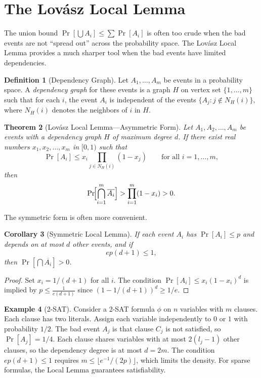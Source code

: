 \documentclass[twoside,12pt]{book}
\theoremstyle{plain}
\newtheorem{theorem}{Theorem}[chapter]
\newtheorem{corollary}[theorem]{Corollary}
\theoremstyle{definition}
\newtheorem{definition}[theorem]{Definition}
\newtheorem{example}[theorem]{Example}
\theoremstyle{remark}
\begin{document}
\section{The Lov\'{a}sz Local Lemma}
\label{sec:lll}

The union bound $\Pr[\bigcup A_i] \leq \sum \Pr[A_i]$ is often too crude
when the bad events are not ``spread out'' across the probability space.
The Lov\'{a}sz Local Lemma provides a much sharper tool when the bad
events have limited dependencies.

\begin{definition}[Dependency Graph]
Let $A_1, \ldots, A_m$ be events in a probability space. A
\emph{dependency graph} for these events is a graph $H$ on vertex set
$\{1, \ldots, m\}$ such that for each $i$, the event $A_i$ is independent
of the events $\{A_j : j \notin N_H(i)\}$, where $N_H(i)$ denotes the
neighbors of $i$ in $H$.
\end{definition}

\begin{theorem}[Lov\'{a}sz Local Lemma---Asymmetric Form]
\label{thm:lll}
Let $A_1, A_2, \ldots, A_m$ be events with a dependency graph $H$ of
maximum degree $d$. If there exist real numbers $x_1, x_2, \ldots, x_m$
in $[0, 1)$ such that
\[
\Pr[A_i] \leq x_i \prod_{j \in N_H(i)} (1 - x_j)
\qquad \text{for all } i = 1, \ldots, m,
\]
then
\[
\Pr\!\Bigl[\bigcap_{i=1}^{m} \overline{A_i}\Bigr]
> \prod_{i=1}^{m} (1 - x_i) > 0.
\]
\end{theorem}

The symmetric form is often more convenient.

\begin{corollary}[Symmetric Local Lemma]
\label{cor:lll-symmetric}
If each event $A_i$ has $\Pr[A_i] \leq p$ and depends on at most $d$
other events, and if
\[
ep(d + 1) \leq 1,
\]
then $\Pr[\bigcap \overline{A_i}] > 0$.
\end{corollary}

\begin{proof}
Set $x_i = 1/(d+1)$ for all $i$. The condition $\Pr[A_i] \leq
x_i(1 - x_i)^d$ is implied by $p \leq \frac{1}{e(d+1)}$ since
$(1 - 1/(d+1))^d \geq 1/e$.
\end{proof}

\begin{example}[2-SAT]
Consider a 2-SAT formula $\phi$ on $n$ variables with $m$ clauses. Each
clause has two literals. Assign each variable independently to $0$ or $1$
with probability $1/2$. The bad event $A_j$ is that clause $C_j$ is not
satisfied, so $\Pr[A_j] = 1/4$. Each clause shares variables with at most
$2(l_j - 1)$ other clauses, so the dependency degree is at most $d = 2m$.
The condition $ep(d+1) \leq 1$ requires $m \leq \lfloor e^{-1}/(2p) \rfloor$,
which limits the density. For sparse formulas, the Local Lemma guarantees
satisfiability.
\end{example}
\end{document}
